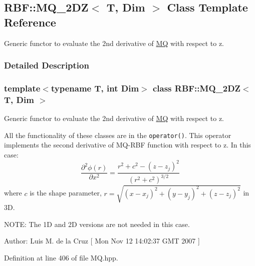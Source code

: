 \hypertarget{classRBF_1_1MQ__2DZ}{
\subsection{RBF::MQ\_\-2DZ$<$ T, Dim $>$ Class Template Reference}
\label{classRBF_1_1MQ__2DZ}
}
Generic functor to evaluate the 2nd derivative of \hyperlink{classRBF_1_1MQ}{MQ} with respect to z.  




\subsubsection{Detailed Description}
\subsubsection*{template$<$typename T, int Dim$>$ class RBF::MQ\_\-2DZ$<$ T, Dim $>$}

Generic functor to evaluate the 2nd derivative of \hyperlink{classRBF_1_1MQ}{MQ} with respect to z. 

All the functionality of these classes are in the {\tt operator()}. This operator implements the second derivative of MQ-RBF function with respect to z. In this case: \[ \frac{\partial^2 \phi(r)}{\partial x^2} = \frac{r^2 + c^2 - (z-z_j)^2}{(r^2+c^2)^{3/2}} \] where $ c $ is the shape parameter, $ r = \sqrt{(x - x_j)^2 + (y - y_j)^2 + (z - z_j)^2} $ in 3D. \begin{Desc}
\item[NOTE: The 1D and 2D versions are not needed in this case.]\end{Desc}
\begin{Desc}
\item[Author:]Luis M. de la Cruz \mbox{[} Mon Nov 12 14:02:37 GMT 2007 \mbox{]} \end{Desc}


Definition at line 406 of file MQ.hpp.